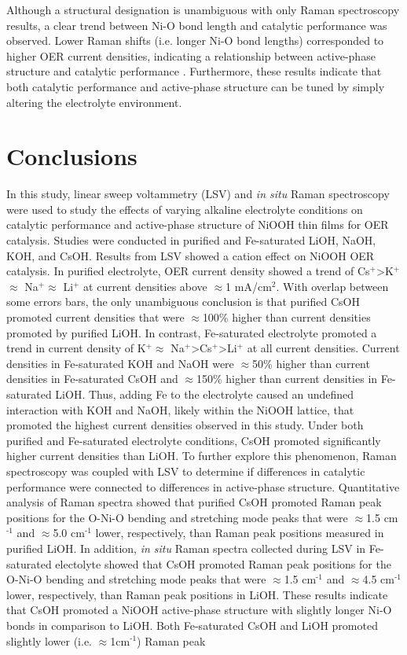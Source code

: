 \documentclass[journal=jpccck,manuscript=article,email=true]{achemso}
\begin{document}
Although a structural designation is unambiguous with only Raman spectroscopy results, a clear trend between Ni-O bond length and catalytic performance was observed. Lower Raman shifts (i.e. longer Ni-O bond lengths) corresponded to higher OER current densities, indicating a relationship between active-phase structure and catalytic performance \cite{hardcastle-1990-deter-raman}. Furthermore, these results indicate that both catalytic performance and active-phase structure can be tuned by simply altering the electrolyte environment.

\section{Conclusions}
\label{sec-4}
In this study, linear sweep voltammetry (LSV) and \emph{in situ} Raman spectroscopy were used to study the effects of varying alkaline electrolyte conditions on catalytic performance and active-phase structure of NiOOH thin films for OER catalysis. Studies were conducted in purified and Fe-saturated LiOH, NaOH, KOH, and CsOH. Results from LSV showed a cation effect on NiOOH OER catalysis. In purified electrolyte, OER current density showed a trend of Cs$^{\text{+}}$\textgreater K$^{\text{+}}$$\approx$ Na$^{\text{+}}$$\approx$ Li$^{\text{+}}$ at current densities above $\approx$1 mA/cm$^{\text{2}}$. With overlap between some errors bars, the only unambiguous conclusion is that purified CsOH promoted current densities that were $\approx$100\% higher than current densities promoted by purified LiOH. In contrast, Fe-saturated electrolyte promoted a trend in current density of K$^{\text{+}}$$\approx$ Na$^{\text{+}}$\textgreater Cs$^{\text{+}}$\textgreater Li$^{\text{+}}$ at all current densities. Current densities in Fe-saturated KOH and NaOH were $\approx$50\% higher than current densities in Fe-saturated CsOH and $\approx$150\% higher than current densities in Fe-saturated LiOH. Thus, adding Fe to the electrolyte caused an undefined interaction with KOH and NaOH, likely within the NiOOH lattice, that promoted the highest current densities observed in this study. Under both purified and Fe-saturated electrolyte conditions, CsOH promoted significantly higher current densities than LiOH. To further explore this phenomenon, Raman spectroscopy was coupled with LSV to determine if differences in catalytic performance were connected to differences in active-phase structure. Quantitative analysis of Raman spectra showed that purified CsOH promoted Raman peak positions for the O-Ni-O bending and stretching mode peaks that were $\approx$1.5 cm$^{\text{-1}}$ and $\approx$5.0 cm$^{\text{-1}}$ lower, respectively, than Raman peak positions measured in purified LiOH. In addition, \emph{in situ} Raman spectra collected during LSV in Fe-saturated electolyte showed that CsOH promoted Raman peak positions for the O-Ni-O bending and stretching mode peaks that were $\approx$1.5 cm$^{\text{-1}}$ and $\approx$4.5 cm$^{\text{-1}}$ lower, respectively, than Raman peak positions in LiOH. These results indicate that CsOH promoted a NiOOH active-phase structure with slightly longer Ni-O bonds in comparison to LiOH. Both Fe-saturated CsOH and LiOH promoted slightly lower (i.e. $\approx$1cm$^{\text{-1}}$) Raman peak 
\end{document}

